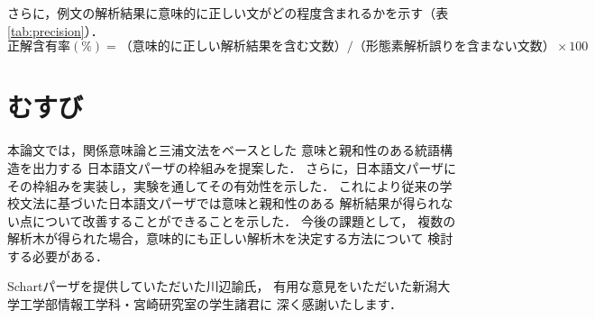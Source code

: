 \documentclass[japanese]{jnlp_1.2}
\begin{document}
さらに，例文の解析結果に意味的に正しい文がどの程度含まれるかを示す（表\ref{tab:precision}）．
\begin{displaymath}
正解含有率(\%) = （意味的に正しい解析結果を含む文数） / （形態素解析誤りを含まない文数） \times 100  
\end{displaymath}

\section{むすび}
本論文では，関係意味論と三浦文法をベースとした
意味と親和性のある統語構造を出力する
日本語文パーザの枠組みを提案した．
さらに，日本語文パーザにその枠組みを実装し，実験を通してその有効性を示した．
これにより従来の学校文法に基づいた日本語文パーザでは意味と親和性のある
解析結果が得られない点について改善することができることを示した．
今後の課題として，
複数の解析木が得られた場合，意味的にも正しい解析木を決定する方法について
検討する必要がある．




\acknowledgment

Schartパーザを提供していただいた川辺諭氏，
有用な意見をいただいた新潟大学工学部情報工学科・宮崎研究室の学生諸君に
深く感謝いたします．
\end{document}
